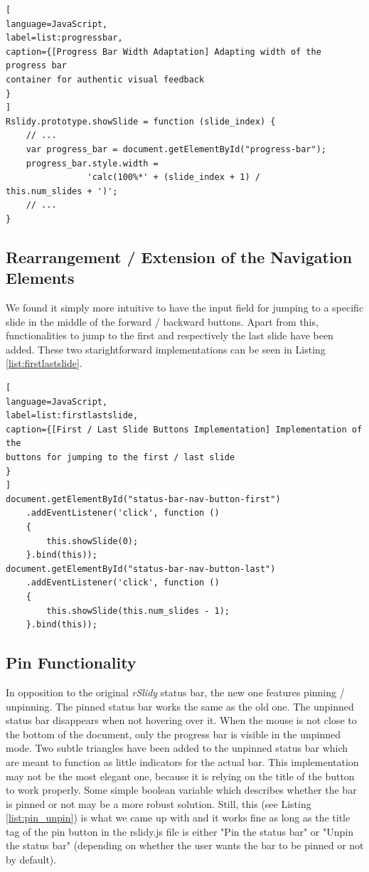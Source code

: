 \begin{lstlisting}[
language=JavaScript,
label=list:progressbar,
caption={[Progress Bar Width Adaptation] Adapting width of the progress bar 
container for authentic visual feedback
}
]
Rslidy.prototype.showSlide = function (slide_index) {
	// ...
	var progress_bar = document.getElementById("progress-bar");
	progress_bar.style.width =
				'calc(100%*' + (slide_index + 1) / 
this.num_slides + ')';
	// ...
}
\end{lstlisting}

\subsection{Rearrangement / Extension of the Navigation Elements}
We found it simply more intuitive to have the input field for jumping to a 
specific slide in the middle of the forward / backward buttons. Apart from 
this, functionalities to jump to the first and respectively the last slide have 
been added. These two starightforward implementations can be seen in Listing 
\ref{list:firstlastslide}.

\begin{minipage}{\linewidth}
\begin{lstlisting}[
language=JavaScript,
label=list:firstlastslide,
caption={[First / Last Slide Buttons Implementation] Implementation of the 
buttons for jumping to the first / last slide
}
]
document.getElementById("status-bar-nav-button-first")
	.addEventListener('click', function ()
	{
		this.showSlide(0);
	}.bind(this));
document.getElementById("status-bar-nav-button-last")
	.addEventListener('click', function ()
	{
		this.showSlide(this.num_slides - 1);
	}.bind(this));
\end{lstlisting}
\end{minipage}



\subsection{Pin Functionality}
In opposition to the original \textit{rSlidy} status bar, the new one features 
pinning / unpinning. The pinned status bar works the same as the old one. The 
unpinned status bar disappears when not hovering over it. When the mouse is not 
close to the bottom of the document, only the progress bar is visible in the 
unpinned mode. Two subtle triangles have been added to the unpinned status bar 
which are meant to function as little indicators for the actual bar. This 
implementation may not be the most elegant one, because it is relying on the 
title of the button to work properly. Some simple boolean variable which 
describes whether the bar is pinned or not may be a more robust solution. 
Still, this (see Listing \ref{list:pin_unpin}) is what we came up with and it 
works fine as long as the title tag of the pin button in the rslidy.js file is 
either "Pin the status bar" or "Unpin the status bar" (depending on whether the 
user wants the bar to be pinned or not by default).


